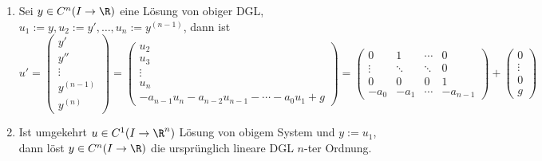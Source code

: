 \begin{nt} \label{4.5}
	\begin{enumerate}[1)]
		\item
			Sei $y \in C^n(I \to \R)$ eine Lösung von obiger DGL, $u_1 := y, u_2 := y', \dotsc, u_n := y^{(n-1)}$, dann ist
			\[
				u' =
				\begin{pmatrix}
					y' \\ y'' \\ \vdots \\ y^{(n-1)} \\ y^{(n)}
				\end{pmatrix}
				=
				\begin{pmatrix}
					u_2 \\ u_3 \\ \vdots \\ u_n \\ -a_{n-1} u_n - a_{n-2} u_{n-1} - \dotsb - a_0 u_1 + g
				\end{pmatrix}
				= \begin{pmatrix}
					0 & 1 & \cdots & 0 \\
					\vdots  & \ddots & \ddots & 0 \\
					0 & 0 & 0 & 1 \\
					-a_0 & -a_1 & \cdots & -a_{n-1}
				\end{pmatrix} + \begin{pmatrix}
					0 \\ \vdots \\ 0 \\ g
				\end{pmatrix}
			\]
		\item
			Ist umgekehrt $u \in C^1(I \to \R^n)$ Lösung von obigem System und $y := u_1$, dann löst $y \in C^n(I \to \R)$ die ursprünglich lineare DGL $n$-ter Ordnung.
	\end{enumerate}
\end{nt}

